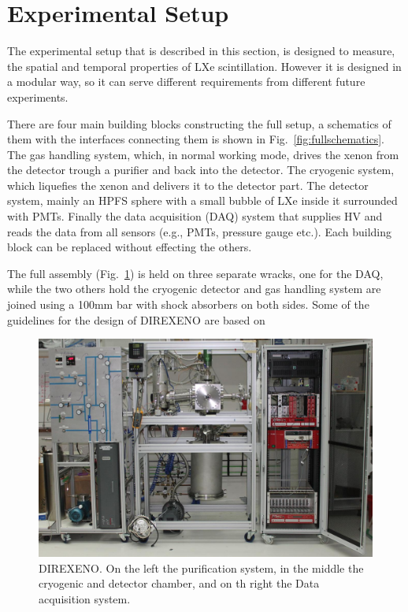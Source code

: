 \section{Experimental Setup}
\label{expSetup}


The experimental setup that is described in this section, is designed to measure, the spatial and temporal properties of LXe scintillation. However it is designed in a modular way, so it can serve different requirements from different future experiments. 

There are four main building blocks constructing the full setup, a schematics of them with the interfaces connecting them is shown in Fig.~\ref{fig:fullschematics}. The gas handling system, which, in normal working mode, drives the xenon from the detector trough a purifier and back into the detector. The cryogenic system, which liquefies the xenon and delivers it to the detector part. The detector system, mainly an HPFS sphere with a small bubble of LXe inside it surrounded with PMTs. Finally the data acquisition (DAQ) system that supplies HV and reads the data from all sensors (e.g., PMTs, pressure gauge etc.). Each building block can be replaced without effecting the others. 

The full assembly (Fig.~\ref{fig:fulldet}) is held on three separate wracks, one for the DAQ, while the two others hold the cryogenic detector and gas handling system are joined using a 100mm bar with shock absorbers on both sides. Some of the guidelines for the design of DIREXENO are based on~\cite{Giboni}  

\begin{figure}[t!]
\centerline{\includegraphics[width=1.\linewidth]{FullDet.jpg}}
\caption{DIREXENO. On the left the purification system, in the middle the cryogenic and detector chamber, and on th right the Data acquisition system.}
\label{fig:fulldet}
\end{figure}

